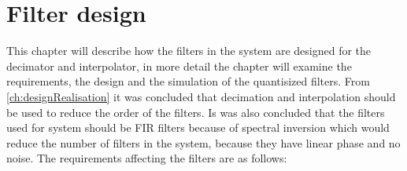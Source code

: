 \chapter{Filter design}
This chapter will describe how the filters in the system are designed for the decimator and interpolator, in more detail the chapter will examine the requirements, the design and the simulation of the quantisized filters. From \autoref{ch:designRealisation} it was concluded that decimation and interpolation should be used to reduce the order of the filters.  
Is was also concluded that the filters used for system should be FIR filters because of spectral inversion which would reduce the number of filters in the system, because they have linear phase and no noise. The requirements affecting the filters are as follows:   





%

%

%